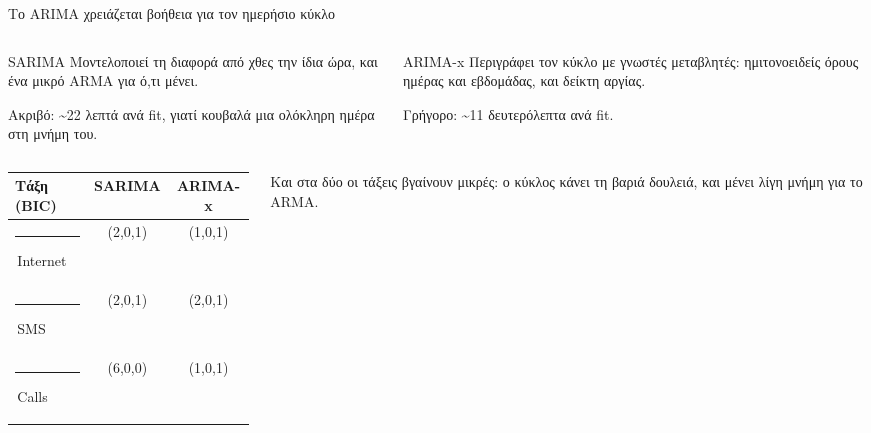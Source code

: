 \documentclass[aspectratio=169,10pt]{beamer}
\newcommand{\muted}[1]{\textcolor{muted}{#1}}
\newcommand{\ser}[2]{\textcolor{#1}{\rule[0.05em]{0.6em}{0.6em}}\,#2}
\newcommand{\sInet}{\ser{inet}{Internet}}
\newcommand{\sSms}{\ser{sms}{SMS}}
\newcommand{\sCalls}{\ser{calls}{Calls}}
\begin{document}

\begin{frame}{Το ARIMA χρειάζεται βοήθεια για τον ημερήσιο κύκλο}
  \begin{columns}[T, onlytextwidth]
    \begin{column}{0.48\textwidth}
      \begin{block}{SARIMA}
        Μοντελοποιεί τη διαφορά από \alert{χθες την ίδια ώρα}, και ένα μικρό ARMA για ό,τι μένει.
        \vspace{0.4em}

        \small\muted{Ακριβό: \textasciitilde 22 λεπτά ανά fit, γιατί κουβαλά μια ολόκληρη ημέρα στη μνήμη του.}
      \end{block}
    \end{column}
    \begin{column}{0.48\textwidth}
      \begin{block}{ARIMA-x}
        Περιγράφει τον κύκλο με \alert{γνωστές μεταβλητές}: ημιτονοειδείς όρους ημέρας και εβδομάδας, και δείκτη αργίας.
        \vspace{0.4em}

        \small\muted{Γρήγορο: \textasciitilde 11 δευτερόλεπτα ανά fit.}
      \end{block}
    \end{column}
  \end{columns}
  \vspace{1em}
  \begin{columns}[c, onlytextwidth]
    \begin{column}{0.48\textwidth}
      \small
      \begin{tabular}{@{}lcc@{}}
        \toprule
        Τάξη (BIC) & SARIMA & ARIMA-x \\
        \midrule
        \sInet & (2,0,1) & (1,0,1) \\
        \sSms & (2,0,1) & (2,0,1) \\
        \sCalls & (6,0,0) & (1,0,1) \\
        \bottomrule
      \end{tabular}
    \end{column}
    \begin{column}{0.48\textwidth}
      Και στα δύο οι τάξεις βγαίνουν \alert{μικρές}: ο κύκλος κάνει τη βαριά δουλειά, και μένει λίγη μνήμη για το ARMA.
    \end{column}
  \end{columns}
\end{frame}
\end{document}
